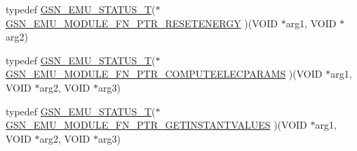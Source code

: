 \begin{DoxyCompactItemize}
\item 
typedef \hyperlink{a00490_aeda27e2bd7f74b1b9748e313d272033e}{GSN\_\-EMU\_\-STATUS\_\-T}($\ast$ \hyperlink{a00490_a343265e26c41f9b84c1c91d6d0006343}{GSN\_\-EMU\_\-MODULE\_\-FN\_\-PTR\_\-RESETENERGY} )(VOID $\ast$arg1, VOID $\ast$arg2)
\item 
typedef \hyperlink{a00490_aeda27e2bd7f74b1b9748e313d272033e}{GSN\_\-EMU\_\-STATUS\_\-T}($\ast$ \hyperlink{a00490_a38e48b9c517ca66deb9c18654d14c2e6}{GSN\_\-EMU\_\-MODULE\_\-FN\_\-PTR\_\-COMPUTEELECPARAMS} )(VOID $\ast$arg1, VOID $\ast$arg2, VOID $\ast$arg3)
\item 
typedef \hyperlink{a00490_aeda27e2bd7f74b1b9748e313d272033e}{GSN\_\-EMU\_\-STATUS\_\-T}($\ast$ \hyperlink{a00490_aeb874e23d573a069ae569c2383444288}{GSN\_\-EMU\_\-MODULE\_\-FN\_\-PTR\_\-GETINSTANTVALUES} )(VOID $\ast$arg1, VOID $\ast$arg2, VOID $\ast$arg3)
\end{DoxyCompactItemize}
